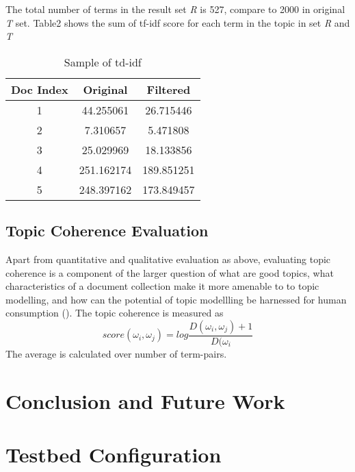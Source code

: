 \documentclass[11pt,twoside]{report}
\begin{document}
The total number of terms in the result set \textit{R} is 527, compare to 2000 in original \textit{T} set.
Table2 shows the sum of tf-idf score for each term in the topic in set  \textit{R} and \textit{T}
\begin{table}[ht]
\caption{Sample of td-idf}
\centering
\begin{tabular}{c c c}
\hline\hline
Doc Index & Original & Filtered\\
\hline
1 & 44.255061 & 26.715446\\
2 & 7.310657 & 5.471808\\
3 & 25.029969 & 18.133856\\
4 & 251.162174 & 189.851251\\
5 & 248.397162 & 173.849457\\
\hline
\end{tabular}
\label{table:Sample of original and filtered topics}
\end{table}

\section{Topic Coherence Evaluation}
Apart from quantitative and qualitative evaluation as above, evaluating topic coherence is a component of the larger question of what are good topics, what characteristics of a document collection make it more amenable to to topic modelling, and how can the potential of topic modellling be harnessed for human consumption (\cite{ref27}). The topic coherence is measured as
\begin{equation}
score(\omega_i, \omega_j) = log\frac{D(\omega_i, \omega_j) + 1}{D(\omega_i}
\end{equation}
The average is calculated over number of term-pairs.

\chapter{Conclusion and Future Work}

\appendix
\chapter{Testbed Configuration}



\end{document}
